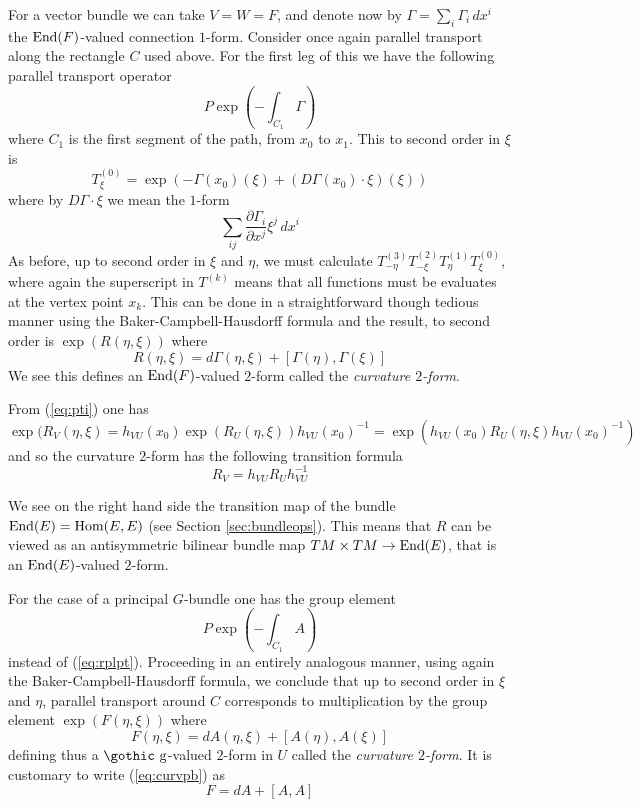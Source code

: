 \documentclass[12pt,titlepage]{article}
\def\goth#1{\hbox{\gothic #1}}
\def\gg{{\goth g}}
\def\End{\hbox{End}}
\def\Hom{\hbox{Hom}}
\begin{document}
For a vector bundle  we can take \(V=W=F\), and denote now by
\(\Gamma=\sum_i\Gamma_i\,dx^i\) the
\(\End(F)\)-valued connection \(1\)-form.
Consider once again parallel transport along the rectangle \(C\) used
above. For the first leg of this we have the following parallel
transport
operator
\begin{equation}\label{eq:rplpt}%
P\exp\left(-\int_{C_1}\Gamma\right)
\end{equation}%
where \(C_1\) is the first segment of the path, from \(x_0\) to \(x_1\).
This to second order in \(\xi\) is
\[
T^{(0)}_\xi = \exp\left(-\Gamma(x_0)(\xi) +
(D\Gamma(x_0)\cdot\xi)(\xi)\right)
\]
where by \(D\Gamma\cdot\xi\) we mean the \(1\)-form
\[
\sum_{ij}\frac{\partial
\Gamma_i}{\partial x^j}\xi^j\,dx^i
\]
 As before, up to second order in
\(\xi\) and \(\eta\), we must calculate
\(T_{-\eta}^{(3)} T_{-\xi}^{(2)}
T_\eta^{(1)} T_\xi^{(0)}\),  where again the superscript  in \(T^{(k)}\)
means that all functions must be evaluates at the vertex point \(x_k\).
This can be done in a straightforward though tedious manner using the
Baker-Campbell-Hausdorff formula and the result, to second order
is \(\exp(R(\eta,\xi))\) where
\begin{equation}\label{eq:curvvb}%
R(\eta,\xi) = d\Gamma(\eta,\xi) + [\Gamma(\eta), \Gamma(\xi)]
\end{equation}%
 We see
this defines an \(\End(F)\)-valued \(2\)-form called the {\em curvature
\(2\)-form\/}.
%
\index{\(2\)-form!\(\End(F)\)-valued}%

From (\ref{eq:pti}) one has \(\exp(R_V(\eta,\xi)=
h_{VU}(x_0)\exp(R_U(\eta,\xi))h_{VU}(x_0)^{-1} =
\exp(h_{VU}(x_0)R_U(\eta,\xi) h_{VU}(x_0)^{-1})\)
and so the curvature \(2\)-form has the
following transition formula 
\begin{equation}\label{eq:curvtran}
R_V =h_{VU}R_Uh_{VU}^{-1}
\end{equation}

We see on the right hand side the transition map of the bundle
\(\End(E)=\Hom(E,E)\) (see Section \ref{sec:bundleops}). 
This means that \(R\) can be viewed as an antisymmetric bilinear bundle map 
\(TM\times TM \to \End(E)\), that is an \(\End(E)\)-valued \(2\)-form. 


For the case of a principal \(G\)-bundle one
has the group element
\[
P\exp\left(-\int_{C_1}A \right)
\]
 instead of
(\ref{eq:rplpt}). Proceeding in an entirely analogous manner, using again
the Baker-Campbell-Hausdorff formula, we conclude that up to second order
in \(\xi\) and \(\eta\), parallel transport around \(C\) corresponds to
multiplication by the group element \(\exp(F(\eta,\xi))\) where
\begin{equation}\label{eq:curvpb}%
F(\eta,\xi) = dA (\eta,\xi) + [A (\eta), A (\xi)]
\end{equation}%
defining thus a \(\gg\)-valued \(2\)-form in \(U\) called the {\em
curvature \(2\)-form\/}.
%
\index{\(2\)-form!\(\gg\)-valued}%
 It is customary to write (\ref{eq:curvpb}) as
\[
F = dA  + [A ,A ]
\]
\end{document}
